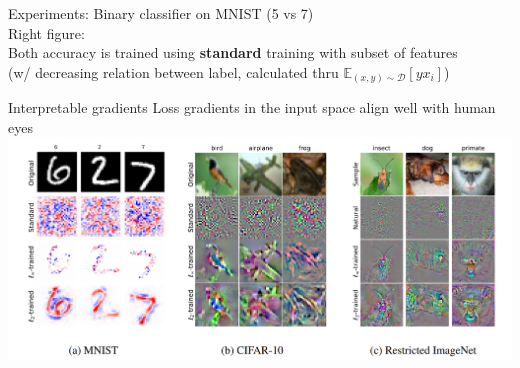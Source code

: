 \documentclass{beamer}
\begin{document}
\begin{frame}{Experiments: Binary classifier on MNIST (5 vs 7)}
  \\
  Right figure: \\Both accuracy is trained using \textbf{standard} training with subset of features \\
(w/ decreasing relation between label, calculated thru $\mathbb{E}_{(x,y) \sim \mathcal{D}}[yx_i]$)
\end{frame}

\begin{frame}{Interpretable gradients}
  Loss gradients in the input space align well with human eyes
  \includegraphics[width=\textwidth]{fig/p2/int-grad.png}
\end{frame}
\end{document}
